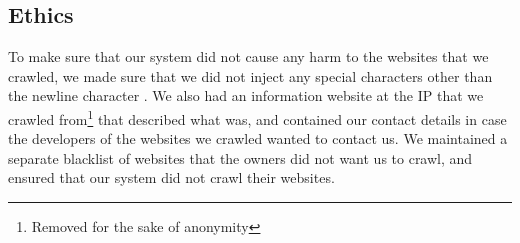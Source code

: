 \subsection{Ethics}

To make sure that our system did not cause any harm to the websites that we crawled, we made sure that we did not inject any special characters other than the newline character%
. We also had an information website at the IP that we crawled from\footnote{Removed for the sake of anonymity} that described what \ehi was, and contained our contact details in case the developers of the websites we crawled wanted to contact us. We maintained a separate blacklist of websites that the owners did not want us to crawl, and ensured that our system did not crawl their websites.
